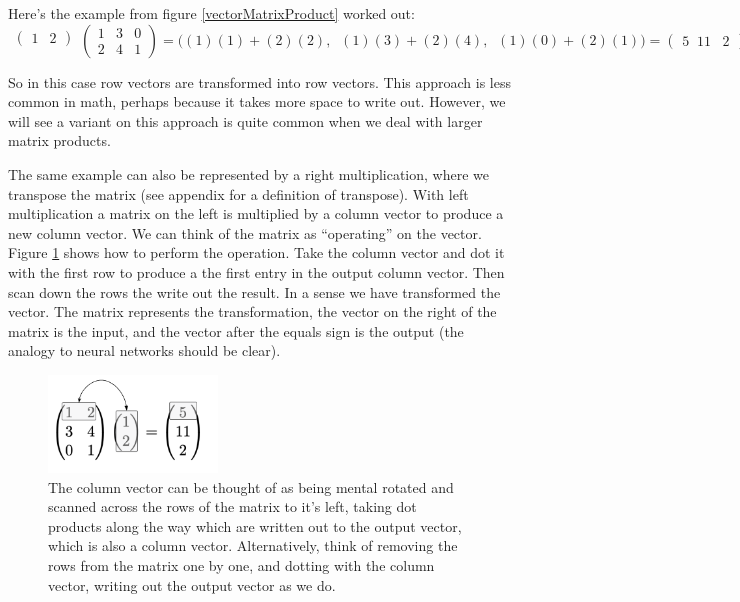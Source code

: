 Here's the example from figure \ref{vectorMatrixProduct} worked out:
\[
  \begin{matrix}\begin{pmatrix}1 & 2\end{pmatrix}\\\mbox{}\end{matrix}
  \begin{pmatrix} 1 & 3 & 0 \\ 2 & 4 & 1 \end{pmatrix} 
  =
  \bigg( (1)(1) + (2)(2) ,\;\; (1)(3) + (2)(4) ,\;\; (1)(0)+ (2)(1) \bigg)
  =
  \begin{pmatrix}  5 \;\; 11 \;\;\; 2  \end{pmatrix}
\]
\vspace*{.1cm} 

So in this case row vectors are transformed into row vectors. This approach is less common in math, perhaps because it takes more space to write out. However, we will see a variant on this approach is quite common when we deal with larger matrix products.

The same example can also be represented by a right multiplication, where we transpose the matrix (see appendix for a definition of transpose). With left multiplication  a matrix on the left is multiplied by a column vector to produce a new column vector. We can think of the matrix as ``operating'' on the vector. Figure \ref{matrixVectorProduct} shows how to perform the operation. Take the column vector and dot it with the first row to produce a the first entry in the output column vector. Then scan down the rows the write out the result. In a sense we have transformed the vector. The matrix represents the transformation, the vector on the right of the matrix is the input, and the vector after the equals sign is the output (the analogy to neural networks should be clear).

\begin{figure}[h]
\centering
\includegraphics[width=0.4\textwidth]{images/matrixVectorProduct.png}
\caption[Jeff Yoshimi.]{The column vector can be thought of as being mental rotated and scanned across the rows of the matrix to it's left, taking dot products along the way which are written out to the output vector, which is also a column vector. Alternatively, think of removing the rows from the matrix one by one, and dotting with the column vector, writing out the output vector as we do.}
\label{matrixVectorProduct}
\end{figure}

